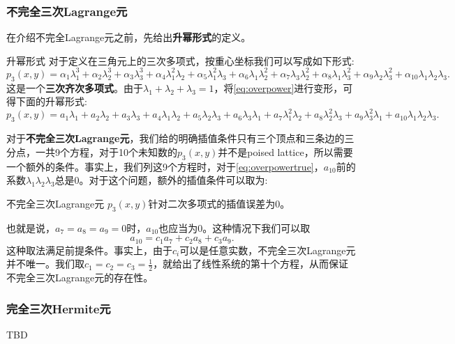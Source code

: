 \subsubsection{不完全三次Lagrange元}
在介绍不完全Lagrange元之前，先给出\textbf{升幂形式}的定义。 
\begin{definition}{升幂形式}
    对于定义在三角元上的三次多项式，按重心坐标我们可以写成如下形式:
    \begin{equation}
        \label{eq:overpower}
        p_{3}(x,y)=\alpha_{1}\lambda_{1}^{3}+\alpha_{2}\lambda_{2}^{3}+\alpha_{3}\lambda_{3}^{3}+\alpha_{4}\lambda_{1}^{2}\lambda_{2}+\alpha_{5}\lambda_{1}^{2}\lambda_{3}+\alpha_{6}\lambda_{1}\lambda_{2}^{2}+\alpha_{7}\lambda_{3}\lambda_{2}^{2}+\alpha_{8}\lambda_{1}\lambda_{3}^{2}+\alpha_{9}\lambda_{2}\lambda_{3}^{2}+\alpha_{10}\lambda_{1}\lambda_{2}\lambda_{3}.
    \end{equation}
    这是一个\textbf{三次齐次多项式}。由于$\lambda_{1}+\lambda_{2}+\lambda_{3}=1$，将\eqref{eq:overpower}进行变形，可得下面的升幂形式:
    \begin{equation}
        \label{eq:overpowertrue}
        p_{3}(x,y)=a_{1}\lambda_{1}+a_{2}\lambda_{2}+a_{3}\lambda_{3}+a_{4}\lambda_{1}\lambda_{2}+a_{5}\lambda_{2}\lambda_{3}+a_{6}\lambda_{3}\lambda_{1}+a_{7}\lambda_{1}^{2}\lambda_{2}+a_{8}\lambda_{2}^{2}\lambda_{3}+a_{9}\lambda_{3}^{2}\lambda_{1}+a_{10}\lambda_{1}\lambda_{2}\lambda_{3}.
    \end{equation}
\end{definition}
对于\textbf{不完全三次Lagrange元}，我们给的明确插值条件只有三个顶点和三条边的三分点，一共9个方程，对于10个未知数的$p_{3}(x,y)$并不是poised lattice，所以需要一个额外的条件。事实上，我们列这9个方程时，对于\eqref{eq:overpowertrue}，$a_{10}$前的系数$\lambda_{1}\lambda_{2}\lambda_{3}$总是0。对于这个问题，额外的插值条件可以取为:
\begin{definition}{不完全三次Lagrange元}
    $p_{3}(x,y)$针对二次多项式的插值误差为0。
\end{definition}
也就是说，$a_{7}=a_{8}=a_{9}=0$时，$a_{10}$也应当为0。这种情况下我们可以取
\begin{equation}
    \label{eq:a10}
    a_{10}=c_{1}a_{7}+c_{2}a_{8}+c_{3}a_{9}.
\end{equation}
这种取法满足前提条件。事实上，由于$c_{i}$可以是任意实数，不完全三次Lagrange元并不唯一。我们取$c_{1}=c_{2}=c_{3}=\frac{1}{2}$，就给出了线性系统的第十个方程，从而保证不完全三次Lagrange元的存在性。
\subsubsection{完全三次Hermite元}
TBD
